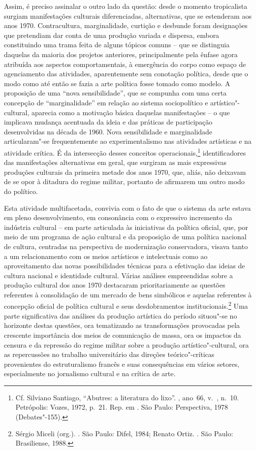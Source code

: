Assim, é preciso assinalar o outro lado da questão: desde o momento
tropicalista surgiam manifestações culturais diferenciadas,
alternativas, que se estenderam aos anos 1970. Contracultura,
marginalidade, curtição e desbunde foram designações que pretendiam dar
conta de uma produção variada e dispersa, embora constituindo uma trama
feita de alguns tópicos comuns -- que se distinguia daquelas da maioria
dos projetos anteriores, principalmente pela ênfase agora atribuída aos
aspectos comportamentais, à emergência do corpo como espaço de
agenciamento das atividades, aparentemente sem conotação política, desde
que o modo como até então se fazia a arte política fosse tomado como
modelo. A proposição de uma ``nova sensibilidade'', que se compunha com
uma certa concepção de ``marginalidade'' em relação ao sistema
sociopolítico e artístico"-cultural, aparecia como a motivação básica
daquelas manifestações -- o que implicava mudança acentuada da ideia e
das práticas de participação desenvolvidas na década de 1960. Nova
sensibilidade e marginalidade articularam"-se frequentemente ao
experimentalismo nas atividades artísticas e na atividade crítica. É da
intersecção desses conceitos operacionais,\footnote{Cf. Silviano
  Santiago, ``Abutres: a literatura do lixo''. {},
  ano~66, v.~, n.~10. Petrópolis: Vozes, 1972, p.~21. Rep. em
  {}. São Paulo: Perspectiva, 1978
  (Debates"-155).} identificadores das manifestações alternativas em
geral, que surgiram as mais expressivas produções culturais da primeira
metade dos anos 1970, que, aliás, não deixavam de se opor à ditadura do
regime militar, portanto de afirmarem um outro modo do político.

Esta atividade multifacetada, convivia com o fato de que o sistema da
arte estava em pleno desenvolvimento, em consonância com o expressivo
incremento da indústria cultural -- em parte articulada às iniciativas
da política oficial, que, por meio de um programa de ação cultural e da
proposição de uma política nacional de cultura, centradas na perspectiva
de modernização conservadora, visava tanto a um relacionamento com os
meios artísticos e intelectuais como ao aproveitamento das novas
possibilidades técnicas para a efetivação das ideias de cultura nacional
e identidade cultural. Várias análises empreendidas sobre a produção
cultural dos anos 1970 destacaram prioritariamente as questões
referentes à consolidação de um mercado de bens simbólicos e aquelas
referentes à concepção oficial de política cultural e seus
desdobramentos institucionais.\footnote{Sérgio Miceli (org.).
  {}. São Paulo: Difel, 1984; Renato
  Ortiz. {}. São Paulo: Brasiliense,
  1988.} Uma parte significativa das análises da produção artística do
período situou"-se no horizonte destas questões, ora tematizando as
transformações provocadas pela crescente importância dos meios de
comunicação de massa, ora os impactos da censura e da repressão do
regime militar sobre a produção artístico"-cultural, ora as repercussões
no trabalho universitário das direções teórico"-críticas provenientes do
estruturalismo francês e suas consequências em vários setores,
especialmente no jornalismo cultural e na crítica de arte.

